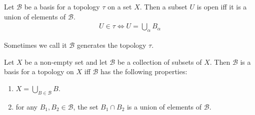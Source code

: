 \begin{proposition}{}{}
    \label{pro:open sets are unions of elements of basis2}
    Let $\mathcal{B}$ be a basis for a topology $\tau$ on a set $X$.
    Then a subset $U$ is open iff it is a union of elements of
    $\mathcal{B}$.
    \begin{align*}
        U \in \tau \iff U = \bigcup_{\alpha} B_{\alpha}
    \end{align*}
\end{proposition}
Sometimes we call it $\mathcal{B}$ generates the topology $\tau$.

\begin{theorem}{}{}
    \label{thm:basis}
    Let $X$ be a non-empty set and let $\mathcal{B}$ be a collection
    of subsets of $X$. Then
    $\mathcal{B}$ is a basis for a topology on $X$ iff $\mathcal{B}$
    has the following properties:
    \begin{enumerate}
        \item $X = \bigcup_{B \in \mathcal{B}} B$.
        \item for any $B_{1},B_{2} \in \mathcal{B}$, the set $B_{1}
            \cap B_{2}$ is a union of elements of $\mathcal{B}$.
    \end{enumerate}
\end{theorem}


